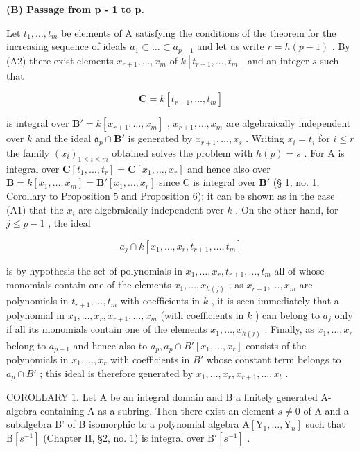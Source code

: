 \textbf{(B) Passage from p - 1 to p.}\par

Let \(t_1, \ldots, t_m\) be elements of A satisfying the conditions of the theorem for the increasing sequence of ideals \(a_1 \subset \ldots \subset a_{p-1}\) and let us write \(r = h(p - 1)\) . By (A2) there exist elements \(x_{r+1}, \ldots, x_m\) of \(k[t_{r+1}, \ldots, t_m]\) and an integer \(s\) such that

\[
\mathbf {C} = k [ t _ {r + 1}, \dots , t _ {m} ]
\]

is integral over \(\mathbf{B}' = k[x_{r+1},\ldots,x_m]\) , \(x_{r+1},\ldots,x_m\) are algebraically independent over \(k\) and the ideal \(\mathfrak{a}_p\cap\mathbf{B}'\) is generated by \(x_{r+1},\ldots,x_s\) . Writing \(x_i=t_i\) for \(i\leqslant r\) the family \((x_i)_{1\leqslant i\leqslant m}\) obtained solves the problem with \(h(p)=s\) . For A is integral over \(\mathbf{C}[t_1,\ldots,t_r]=\mathbf{C}[x_1,\ldots,x_r]\) and hence also over \(\mathbf{B}=k[x_1,\ldots,x_m]=\mathbf{B}'[x_1,\ldots,x_r]\) since C is integral over \(\mathbf{B}'\) (§ 1, no. 1, Corollary to Proposition 5 and Proposition 6); it can be shown as in the case (A1) that the \(x_i\) are algebraically independent over \(k\) . On the other hand, for \(j\leqslant p-1\) , the ideal

\[
a _ {j} \cap k [ x _ {1}, \dots , x _ {r}, t _ {r + 1}, \dots , t _ {m} ]
\]

is by hypothesis the set of polynomials in \(x_1, \ldots, x_r, t_{r+1}, \ldots, t_m\) all of whose monomials contain one of the elements \(x_1, \ldots, x_{h(j)}\) ; as \(x_{r+1}, \ldots, x_m\) are polynomials in \(t_{r+1}, \ldots, t_m\) with coefficients in \(k\) , it is seen immediately that a polynomial in \(x_1, \ldots, x_r, x_{r+1}, \ldots, x_m\) (with coefficients in \(k\) ) can belong to \(a_j\) only if all its monomials contain one of the elements \(x_1, \ldots, x_{h(j)}\) . Finally, as \(x_1, \ldots, x_r\) belong to \(a_{p-1}\) and hence also to \(a_p, a_p \cap B'[x_1, \ldots, x_r]\) consists of the polynomials in \(x_1, \ldots, x_r\) with coefficients in \(B'\) whose constant term belongs to \(a_p \cap B'\) ; this ideal is therefore generated by \(x_1, \ldots, x_r, x_{r+1}, \ldots, x_t\) .

COROLLARY 1. Let A be an integral domain and B a finitely generated A-algebra containing A as a subring. Then there exist an element \(s \neq 0\) of A and a subalgebra B' of B isomorphic to a polynomial algebra \(\mathrm{A}[\mathrm{Y}_{1}, \ldots, \mathrm{Y}_{n}]\) such that \(\mathrm{B}[s^{-1}]\) (Chapter II, §2, no. 1) is integral over \(\mathrm{B}'[s^{-1}]\) .

